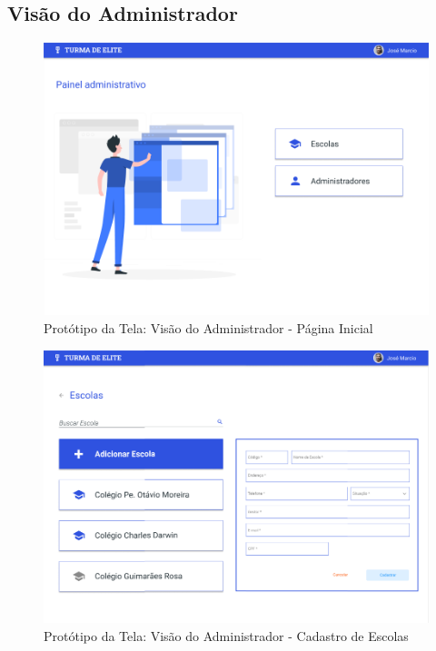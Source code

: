 \documentclass[
    12pt,               %
    openright,          %
    oneside,
    a4paper,            %
    english,            %
    brazil              %
    ]{ifsp-spo-inf-ctds} %
\begin{document}
\begin{apendicesenv}
\section{Visão do Administrador}

\begin{figure}[htb]
    \centering
	\includegraphics[width=16cm]{imagens/Administrador-PaginaInicial.png}
	\caption{\label{fig:administrador} Protótipo da Tela: Visão do Administrador - Página Inicial}
\end{figure}
\FloatBarrier

\begin{figure}[htb]
    \centering
	\includegraphics[width=16cm]{imagens/Administrador-CadastroEscola.png}
	\caption{\label{fig:cadastro-escola} Protótipo da Tela: Visão do Administrador - Cadastro de Escolas}
\end{figure}
\FloatBarrier


\end{apendicesenv}
\end{document}
